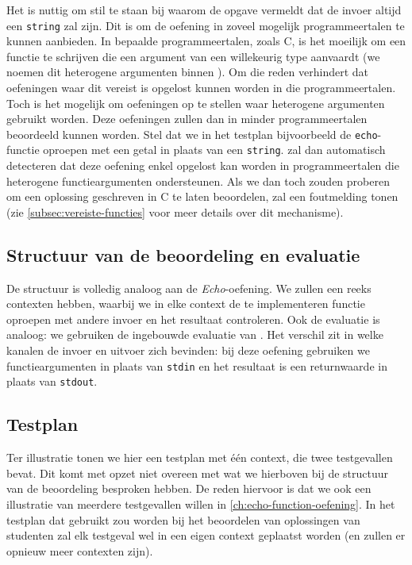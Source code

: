 Het is nuttig om stil te staan bij waarom de opgave vermeldt dat de invoer altijd een \texttt{string} zal zijn.
Dit is om de oefening in zoveel mogelijk programmeertalen te kunnen aanbieden.
In bepaalde programmeertalen, zoals C, is het moeilijk om een functie te schrijven die een argument van een willekeurig type aanvaardt (we noemen dit heterogene argumenten binnen \tested{}).
Om die reden verhindert \tested{} dat oefeningen waar dit vereist is opgelost kunnen worden in die programmeertalen.
Toch is het mogelijk om oefeningen op te stellen waar heterogene argumenten gebruikt worden.
Deze oefeningen zullen dan in minder programmeertalen beoordeeld kunnen worden.
Stel dat we in het testplan bijvoorbeeld de \texttt{echo}-functie oproepen met een getal in plaats van een \texttt{string}.
\tested{} zal dan automatisch detecteren dat deze oefening enkel opgelost kan worden in programmeertalen die heterogene functieargumenten ondersteunen.
Als we dan toch zouden proberen om een oplossing geschreven in C te laten beoordelen, zal \tested{} een foutmelding tonen (zie \cref{subsec:vereiste-functies} voor meer details over dit mechanisme).

\subsection{Structuur van de beoordeling en evaluatie}\label{subsec:oefening-echofunctie-structuur}

De structuur is volledig analoog aan de \emph{Echo}-oefening.
We zullen een reeks contexten hebben, waarbij we in elke context de te implementeren functie oproepen met andere invoer en het resultaat controleren.
Ook de evaluatie is analoog: we gebruiken de ingebouwde evaluatie van \tested{}.
Het verschil zit in welke kanalen de invoer en uitvoer zich bevinden: bij deze oefening gebruiken we functieargumenten in plaats van \texttt{stdin} en het resultaat is een returnwaarde in plaats van \texttt{stdout}.

\subsection{Testplan}\label{subsec:oefening-echofunctie-testplan}

Ter illustratie tonen we hier een testplan met één context, die twee testgevallen bevat.
Dit komt met opzet niet overeen met wat we hierboven bij de structuur van de beoordeling besproken hebben.
De reden hiervoor is dat we ook een illustratie van meerdere testgevallen willen in \cref{ch:echo-function-oefening}.
In het testplan dat gebruikt zou worden bij het beoordelen van oplossingen van studenten zal elk testgeval wel in een eigen context geplaatst worden (en zullen er opnieuw meer contexten zijn).

